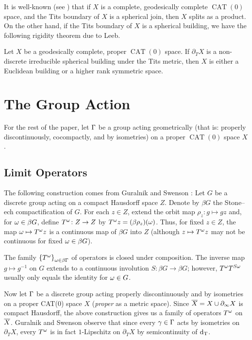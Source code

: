 \documentclass{amsart}
\newcommand{\bdT}{\partial_T}
\newcommand{\bdc}{\partial_{\infty}}
\DeclareMathOperator{\CAT}{CAT}
\begin{document}
It is well-known (see \cite[Theorem II.9.24]{bridson}) that if $X$ is a complete, geodesically complete $\CAT(0)$ space, and the Tits boundary of $X$ is a spherical join, then $X$ splits as a product.
On the other hand, if the Tits boundary of $X$ is a spherical building, we have the following rigidity theorem due to Leeb.

\begin{theorem}			\label{leeb}
Let $X$ be a geodesically complete, proper $\CAT(0)$ space.
If $\bdT X$ is a non-discrete irreducible spherical building under the Tits metric, then $X$ is either a Euclidean building or a higher rank symmetric space.
\end{theorem}



\section{The Group Action}


\begin{standing hypothesis}
For the rest of the paper, let $\Gamma$ be a group acting geometrically (that is: properly discontinuously, cocompactly, and by isometries) on a proper $\CAT(0)$ space $X$.
\end{standing hypothesis}

\subsection{Limit Operators}

The following construction comes from Guralnik and Swenson \cite{gs}:  Let $G$ be a discrete group acting on a compact Hausdorff space $Z$.  Denote by $\beta G$ the Stone--ech compactification of $G$.
For each $z \in Z$, extend the orbit map $\rho_z \colon g \mapsto g z$ and, for $\omega \in \beta G$, define $T^{\omega} \colon Z \to Z$ by $T^{\omega} z = (\beta \rho_z)(\omega)$.
Thus, for fixed $z \in Z$, the map $\omega \mapsto T^{\omega} z$ is a continuous map of $\beta G$ into $Z$ (although $z \mapsto T^{\omega} z$ may not be continuous for fixed $\omega \in \beta G$).

The family $\left\{T^{\omega}\right\}_{\omega \in \beta \Gamma}$ of operators is closed under composition.
The inverse map $g \mapsto g^{-1}$ on $G$ extends to a continuous involution $S \colon \beta G \to \beta G$; however, $T^{\omega} T^{S\omega}$ usually only equals the identity for $\omega \in G$.

Now let $\Gamma$ be a discrete group acting properly discontinuously and by isometries on a proper CAT($0$) space $X$ (\emph{proper} as a metric space).  Since $\cl X = X \cup \bdc X$ is compact Hausdorff, the above construction gives us a family of operators $T^{\omega}$ on $\overline{X}$.  Guralnik and Swenson observe that since every $\gamma \in \Gamma$ acts by isometries on $\bdT X$, every $T^{\omega}$ is in fact $1$-Lipschitz on $\bdT X$ by semicontinuity of $\operatorname{d_T}$.
\end{document}
